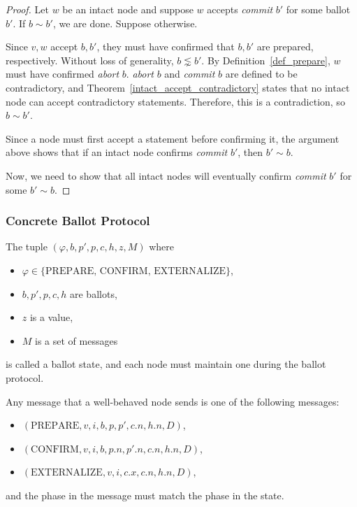 \begin{proof}
    Let $w$ be an intact node and suppose $w$ accepts \textit{commit} $b'$ for some ballot $b'$.
    If $b \sim b'$, we are done.
    Suppose otherwise.

    Since $v, w$ accept $b, b'$, they must have confirmed that $b, b'$ are prepared, respectively.
    Without loss of generality, $b \lnsim b'$.
    By Definition~\ref{def_prepare}, $w$ must have confirmed \textit{abort} $b$.
    \textit{abort} $b$ and \textit{commit} $b$ are defined to be contradictory, and Theorem~\ref{intact_accept_contradictory} states that no intact node can accept contradictory statements.
    Therefore, this is a contradiction, so $b \sim b'$.

    Since a node must first accept a statement before confirming it, the argument above shows that if an intact node confirms \textit{commit} $b'$, then $b' \sim b$.
    
    Now, we need to show that all intact nodes will eventually confirm \textit{commit} $b'$ for some $b' \sim b$.
\end{proof}

\subsubsection{Concrete Ballot Protocol}

\begin{defn}\label{Ballot State}
    The tuple $(\varphi, b, p', p, c, h, z, M)$ where
    \begin{itemize}
        \item
            $\varphi \in \{\text{PREPARE, CONFIRM, EXTERNALIZE}\}$,
        \item
            $b, p', p, c, h$ are ballots,
        \item
            $z$ is a value,
        \item
            $M$ is a set of messages
    \end{itemize}
    is called a ballot state, and each node must maintain one during the ballot protocol.
\end{defn}

\begin{defn}\label{Ballot Message}
    Any message that a well-behaved node sends is one of the following messages:
    \begin{itemize}
        \item
            $(\text{PREPARE}, v, i, b, p, p', c.n, h.n, D)$,
        \item
            $(\text{CONFIRM}, v, i, b, p.n, p'.n, c.n, h.n, D)$,
        \item
            $(\text{EXTERNALIZE}, v, i, c.x, c.n, h.n, D)$,
    \end{itemize}
    and the phase in the message must match the phase in the state.
\end{defn}

